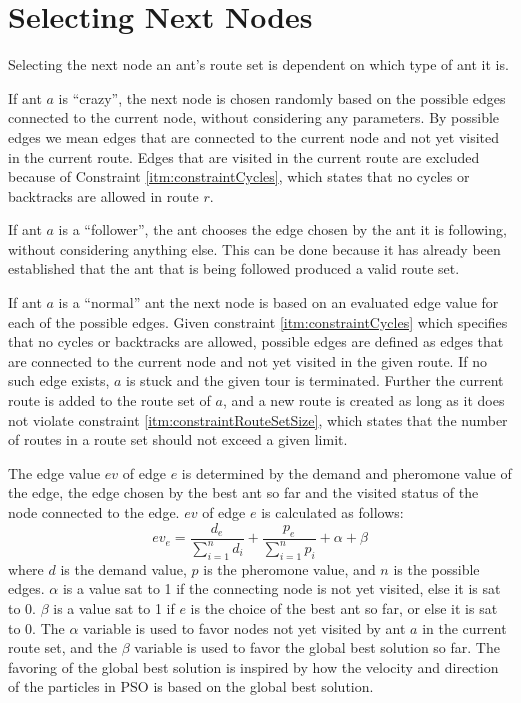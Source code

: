 \section{Selecting Next Nodes}
\label{sec:selectingNextNode}

Selecting the next node an ant's route set is dependent on which type of ant it is. 

If ant $a$ is ``crazy'', the next node is chosen randomly based on the possible edges connected to the current node, without considering any parameters. By possible edges we mean edges that are connected to the current node and not yet visited in the current route. Edges that are visited in the current route are excluded because of Constraint \vref{itm:constraintCycles}, which states that no cycles or backtracks are allowed in route $r$. 

If ant $a$ is a ``follower'', the ant chooses the edge chosen by the ant it is following, without considering anything else. This can be done because it has already been established that the ant that is being followed produced a valid route set. 

If ant $a$ is a ``normal'' ant the next node is based on an evaluated edge value for each of the possible edges. Given constraint \vref{itm:constraintCycles} which specifies that no cycles or backtracks are allowed, possible edges are defined as edges that are connected to the current node and not yet visited in the given route. If no such edge exists, $a$ is stuck and the given tour is terminated. Further the current route is added to the route set of $a$, and a new route is created as long as it does not violate constraint \vref{itm:constraintRouteSetSize}, which states that the number of routes in a route set should not exceed a given limit. 

The edge value $ev$ of edge $e$ is determined by the demand and pheromone value of the edge, the edge chosen by the best ant so far and the visited status of the node connected to the edge. $ev$ of edge $e$ is calculated as follows: 
\newline
$$ev_e = \frac{d_e}{\sum\limits^{n}_{i=1}d_i} + \frac{p_e}{\sum\limits^{n}_{i=1}p_i} + \alpha + \beta$$
\newline
where $d$ is the demand value, $p$ is the pheromone value, and $n$ is the possible edges. $\alpha$ is a value sat to 1 if the connecting node is not yet visited, else it is sat to 0. $\beta$ is a value sat to 1 if $e$ is the choice of the best ant so far, or else it is sat to 0. The $\alpha$ variable is used to favor nodes not yet visited by ant $a$ in the current route set, and the $\beta$ variable is used to favor the global best solution so far. The favoring of the global best solution is inspired by how the velocity and direction of the particles in PSO is based on the global best solution. 

